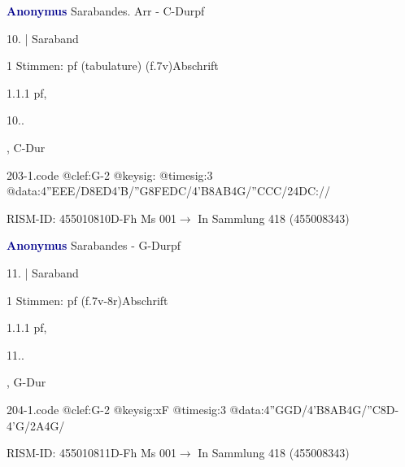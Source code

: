 \documentclass[twocolumn, 12pt]{book}
\begin{document}
\par \vspace{16pt} \textcolor{darkblue}{\textbf{Anonymus  }}\hfillplus{\textbf{[203]}}\newline Sarabandes. Arr - C-Dur\newline pf
\par \begin{itshape}[f.7v, at left:] 10. | Saraband\end{itshape} 
\par \textcolor{darkblue}{}  1 Stimmen: pf (tabulature)  (f.7v)\newline Abschrift
\par 1.1.1  pf, \begin{itshape}10..\end{itshape}, C-Dur  
\begin{filecontents*}{203-1.code}
@clef:G-2
@keysig:
@timesig:3
@data:4''EEE/D{8ED}4'B/''G{8FEDC}/4'B{8AB}4G/''CCC/24DC://
\end{filecontents*}
\newline %
\par RISM-ID: 455010810\newline D-Fh  Ms 001\newline $\rightarrow$ In Sammlung 418 (455008343)
      
\par \vspace{16pt} \textcolor{darkblue}{\textbf{Anonymus  }}\hfillplus{\textbf{[204]}}\newline Sarabandes - G-Dur\newline pf
\par \begin{itshape}[f.7v, at left:] 11. | Saraband\end{itshape} 
\par \textcolor{darkblue}{}  1 Stimmen: pf  (f.7v-8r)\newline Abschrift
\par 1.1.1  pf, \begin{itshape}11..\end{itshape}, G-Dur  
\begin{filecontents*}{204-1.code}
@clef:G-2
@keysig:xF
@timesig:3
@data:4''GGD/4'B{8AB}4G/''C8D-4'G/2A4G/
\end{filecontents*}
\newline %
\par RISM-ID: 455010811\newline D-Fh  Ms 001\newline $\rightarrow$ In Sammlung 418 (455008343)
      
\end{document}

